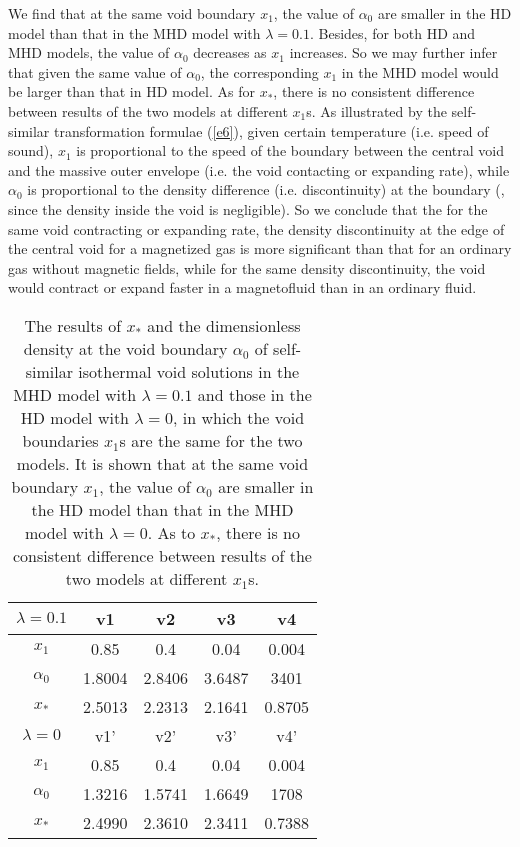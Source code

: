 \documentclass[fleqn,usenatbib]{mnras}
\begin{document}
We find that at the same void boundary $x_{1}$, the value of $\alpha_{0}$ are smaller in the HD model than that in the MHD model with $\lambda=0.1$. Besides, for both HD and MHD models, the value of $\alpha_{0}$ decreases as $x_{1}$ increases. So we may further infer that given the same value of $\alpha_{0}$, the corresponding $x_{1}$ in the MHD model would be larger than that in HD model. As for $x_{*}$, there is no consistent difference between results of the two models at different $x_{1}$s. As illustrated by the self-similar transformation formulae (\ref{e6}), given certain temperature (i.e. speed of sound), $x_{1}$ is proportional to the speed of the boundary between the central void and the massive outer envelope (i.e. the void contacting or expanding rate), while $\alpha_{0}$ is proportional to the density difference (i.e. discontinuity) at the boundary (, since the density inside the void is negligible). So we conclude that the for the same void contracting or expanding rate, the density discontinuity at the edge of the central void for a magnetized gas is more significant than that for an ordinary gas without magnetic fields, while for the same density discontinuity, the void would contract or expand faster in a magnetofluid than in an ordinary fluid. 
\begin{table}
\centering
\caption{The results of $x_{*}$ and the dimensionless density at the void boundary $\alpha_{0}$ of self-similar isothermal void solutions in the MHD model with $\lambda=0.1$ and those in the HD model with $\lambda=0$, in which the void boundaries $x_{1}$s are the same for the two models. It is shown that at the same void boundary $x_{1}$, the value of $\alpha_{0}$ are smaller in the HD model than that in the MHD model with $\lambda=0$. As to $x_{*}$, there is no consistent difference between results of the two models at different $x_{1}$s.}
\begin{tabular}{ccccc}
\hline
$\lambda=0.1$ & v1 & v2 & v3 & v4\\
\hline
$x_{1}$ & 0.85 & 0.4 & 0.04 & 0.004\\
$\alpha_{0}$ & 1.8004 & 2.8406 & 3.6487 & 3401\\
$x_{*}$ & 2.5013 & 2.2313 & 2.1641 & 0.8705\\
\hline
$\lambda=0$ & v1' & v2' & v3' & v4'\\
\hline
$x_{1}$ & 0.85 & 0.4 & 0.04 & 0.004\\
$\alpha_{0}$ & 1.3216 & 1.5741 & 1.6649 & 1708\\
$x_{*}$ & 2.4990 & 2.3610 & 2.3411 & 0.7388\\
\hline
\end{tabular}
\label{t7}
\end{table}
\end{document}
